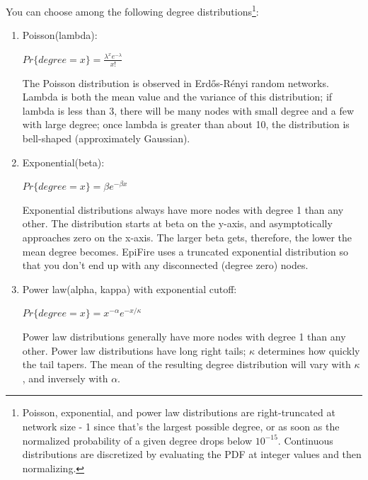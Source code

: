 \documentclass{article}
\begin{document}
\pagebreak
You can choose among the following degree distributions\footnote{Poisson, exponential, and power law distributions are 
right-truncated at network size - 1 since that's the largest possible degree, or as soon as the normalized probability 
of a given degree drops below $10^{-15}$.  Continuous distributions are discretized by evaluating the PDF at integer
values and then normalizing.}: \begin{enumerate}
 \item Poisson(lambda):
			 \begin{center}
				$Pr\{degree = x\} = \frac{\lambda^x e^{-\lambda}}{x!}$
                         \end{center}
The Poisson distribution is observed in Erd\H{o}s-R\'{e}nyi random networks.  Lambda is both the mean value and the variance of this distribution; if lambda is less than 3, there will be many nodes with small degree and a few with large degree; once lambda is greater than about 10, the distribution is bell-shaped (approximately Gaussian).

\vspace{15pt}

 \item Exponential(beta):
			 \begin{center}
				$Pr\{degree = x\} = \beta e^{-\beta x}$
                         \end{center}
Exponential distributions always have more nodes with degree 1 than any other.  The distribution starts at beta on the y-axis, and asymptotically approaches zero on the x-axis. The larger beta gets, therefore, the lower the mean degree becomes.  EpiFire uses a truncated exponential distribution so that you don't end up with any disconnected (degree zero) nodes.

\vspace{15pt}

\item Power law(alpha, kappa) with exponential cutoff:
			 \begin{center}
				$Pr\{degree = x\} = x^{-\alpha} e^{-x/\kappa}$
                         \end{center}
Power law distributions generally have more nodes with degree 1 than any other.  Power law distributions have long right tails; $\kappa$ determines how quickly the tail tapers.  The mean of the resulting degree distribution will vary with $\kappa$, and inversely with $\alpha$.

\vspace{15pt}


\end{enumerate}
\end{document}
